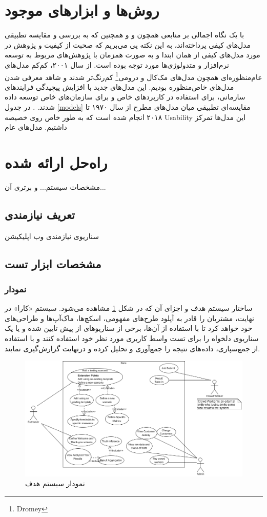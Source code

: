 \documentclass{article}
\theoremstyle{definition}
\begin{document}
\section{روش‌ها و ابزارهای موجود}
با یک نگاه اجمالی بر منابعی همچون
\cite{consolidated}
و 
\cite{pressman}
و همچنین 
\cite{main2}
که به بررسی و مقایسه تطبیقی مدل‌های کیفی پرداخته‌اند، به این نکته پی می‌بریم که صحبت از کیفیت و پژوهش در مورد مدل‌های کیفی از همان ابتدا و به صورت همزمان با پژوهش‌های مربوط به توسعه نرم‌افزار و متدولوژی‌ها مورد توجه بوده است.
از سال ۲۰۰۱، کم‌کم مدل‌های عام‌منظوره‌ای همچون مدل‌های مک‌کال و درومی\footnote{Dromey} کم‌رنگ‌تر شدند و شاهد معرفی شدن مدل‌های خاص‌منظوره بودیم. این مدل‌های جدید با افزایش پیچیدگی فرایندهای سازمانی، برای استفاده در کاربردهای خاص و برای سازمان‌های خاص توسعه داده شدند.
\cite{main2}.
در جدول
\ref{models}
مقایسه‌ای تطبیقی میان مدل‌های مطرح از سال ۱۹۷۰ تا ۲۰۱۸ انجام شده است که به طور خاص روی خصیصه Usability این مدل‌ها تمرکز داشتیم. مدل‌های عام

\section{راه‌حل ارائه شده}
مشخصات سیستم... و برتری آن...
\subsection{تعریف نیازمندی}
سناریوی نیازمندی وب اپلیکیشن
\subsection{مشخصات ابزار تست}
\subsubsection{نمودار }
ساختار سیستم هدف و اجزای آن که در شکل 
\ref{usecase}
مشاهده می‌شود. سیستم «کارا» در نهایت، مشتریان را قادر به آپلود طرح‌های مفهومی، اسکچ‌ها، ماک‌آپ‌ها و طراحی‌های خود خواهد کرد تا با استفاده از آن‌ها، برخی از سناریوهای از پیش تایین شده و یا یک سناریوی دلخواه را برای تست واسط کاربری مورد نظر خود استفاده کنند و با استفاده از جمع‌سپاری، داده‌های نتیجه را جمع‌آوری و تحلیل کرده و درنهایت گزارش‌گیری نمایند.
\begin{figure}[H]
	\centering \includegraphics[width=\linewidth]{Resources/UseCase.png}
	\caption{نمودار  سیستم هدف}
	\label{usecase}
\end{figure}
\end{document}
